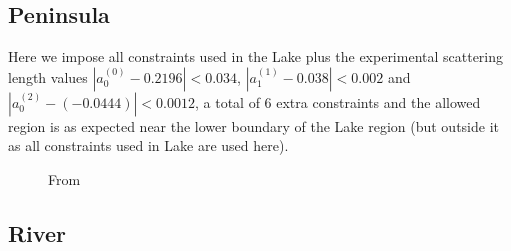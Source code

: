 ﻿\documentclass[12pt,a4paper]{article}
\begin{document}
\subsection{Peninsula}
Here we impose all constraints used in the Lake plus the experimental scattering length values $\left|a_{0}^{(0)}-0.2196\right|<0.034$, $\left|a_{1}^{(1)}-0.038\right|<0.002$ and $\left|a_{0}^{(2)}-(-0.0444)\right|<0.0012$, a total of 6 extra constraints and the allowed region is as expected near the lower boundary of the Lake region (but outside it as all constraints used in Lake are used here).
\begin{figure}[H]
    \centering
    \qquad
    \caption{From \cite{2}}
    \label{fig:example}
\end{figure}










\subsection{River}
\end{document}
